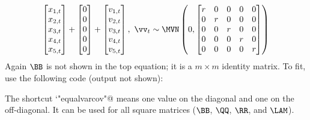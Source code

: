 \begin{gather*}
\begin{bmatrix}x_{1,t}\\x_{2,t}\\x_{3,t}\\x_{4,t}\\x_{5,t}\end{bmatrix}
+ \begin{bmatrix}0\\0\\0\\0\\0\end{bmatrix}
+ \begin{bmatrix}v_{1,t}\\ v_{2,t}\\ v_{3,t}\\ v_{4,t}\\ v_{5,t}\end{bmatrix},
 \textrm{  } \vv_t \sim \MVN\begin{pmatrix} 0,\begin{bmatrix}r&0&0&0&0\\0&r&0&0&0\\0&0&r&0&0\\0&0&0&r&0\\0&0&0&0&r\end{bmatrix} \end{pmatrix}  \\
\end{gather*}
Again $\BB$ is not shown in the top equation; it is a $m \times m$ identity matrix.  To fit, use the following code (output not shown):

The shortcut `\verb@"equalvarcov"@ means one value on the diagonal and one on the off-diagonal.  It can be used for all square matrices ($\BB$, $\QQ$, $\RR$, and $\LAM$).

